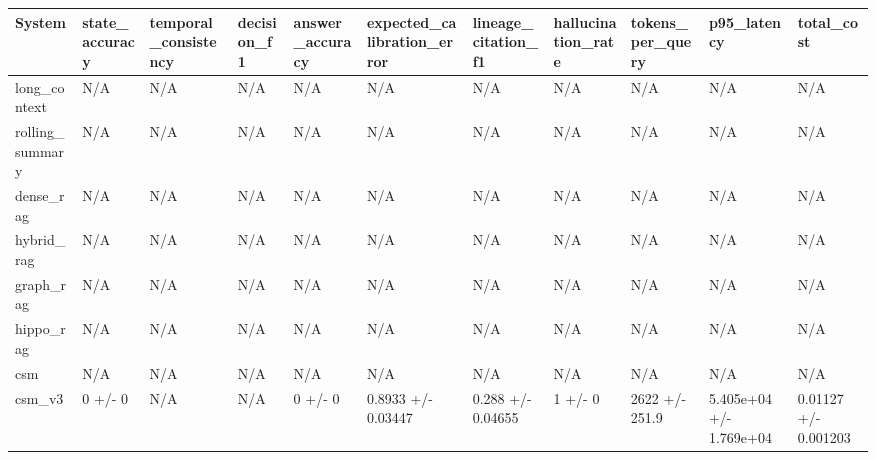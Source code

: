 \begin{tabular}{lllllllllll}
System & state_accuracy & temporal_consistency & decision_f1 & answer_accuracy & expected_calibration_error & lineage_citation_f1 & hallucination_rate & tokens_per_query & p95_latency & total_cost \\
\hline
long\_context & N/A & N/A & N/A & N/A & N/A & N/A & N/A & N/A & N/A & N/A \\
rolling\_summary & N/A & N/A & N/A & N/A & N/A & N/A & N/A & N/A & N/A & N/A \\
dense\_rag & N/A & N/A & N/A & N/A & N/A & N/A & N/A & N/A & N/A & N/A \\
hybrid\_rag & N/A & N/A & N/A & N/A & N/A & N/A & N/A & N/A & N/A & N/A \\
graph\_rag & N/A & N/A & N/A & N/A & N/A & N/A & N/A & N/A & N/A & N/A \\
hippo\_rag & N/A & N/A & N/A & N/A & N/A & N/A & N/A & N/A & N/A & N/A \\
csm & N/A & N/A & N/A & N/A & N/A & N/A & N/A & N/A & N/A & N/A \\
csm\_v3 & 0 +/- 0 & N/A & N/A & 0 +/- 0 & 0.8933 +/- 0.03447 & 0.288 +/- 0.04655 & 1 +/- 0 & 2622 +/- 251.9 & 5.405e+04 +/- 1.769e+04 & 0.01127 +/- 0.001203 \\
\end{tabular}
